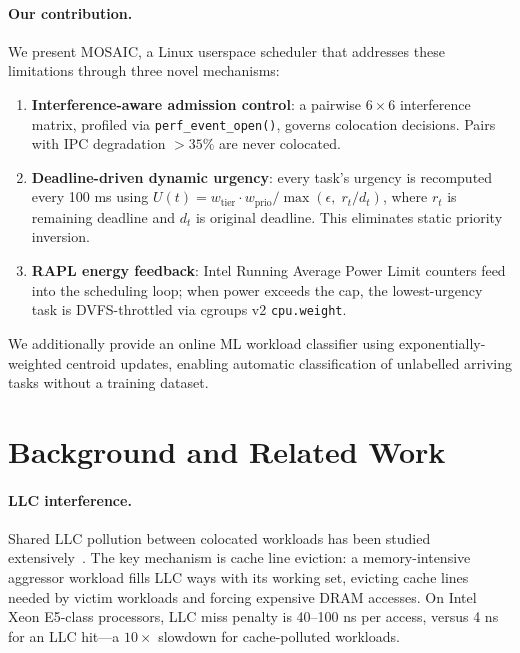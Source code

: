 \documentclass[sigconf,10pt]{acmart}
\newcommand{\sys}{MOSAIC\xspace}
\begin{document}
\paragraph{Our contribution.} We present \sys, a Linux userspace scheduler
that addresses these limitations through three novel mechanisms:

\begin{enumerate}
  \item \textbf{Interference-aware admission control}: a pairwise
        $6\times6$ interference matrix, profiled via \texttt{perf\_event\_open()},
        governs colocation decisions. Pairs with IPC degradation
        $>35\%$ are never colocated.
  \item \textbf{Deadline-driven dynamic urgency}: every task's urgency is
        recomputed every 100 ms using $U(t) = w_\text{tier} \cdot w_\text{prio}
        / \max(\epsilon,\; r_t/d_t)$, where $r_t$ is remaining deadline and
        $d_t$ is original deadline. This eliminates static priority inversion.
  \item \textbf{RAPL energy feedback}: Intel Running Average Power Limit
        counters feed into the scheduling loop; when power exceeds the cap,
        the lowest-urgency task is DVFS-throttled via cgroups v2
        \texttt{cpu.weight}.
\end{enumerate}

We additionally provide an online ML workload classifier using
exponentially-weighted centroid updates, enabling automatic classification
of unlabelled arriving tasks without a training dataset.

\section{Background and Related Work}

\paragraph{LLC interference.}
Shared LLC pollution between colocated workloads has been studied
extensively~\cite{jiang2010ica,lo2015heracles,xu2019parties}.
The key mechanism is cache line eviction: a memory-intensive aggressor
workload fills LLC ways with its working set, evicting cache lines needed
by victim workloads and forcing expensive DRAM accesses.
On Intel Xeon E5-class processors, LLC miss penalty is 40--100 ns
per access, versus 4 ns for an LLC hit—a $10\times$ slowdown for
cache-polluted workloads.
\end{document}
